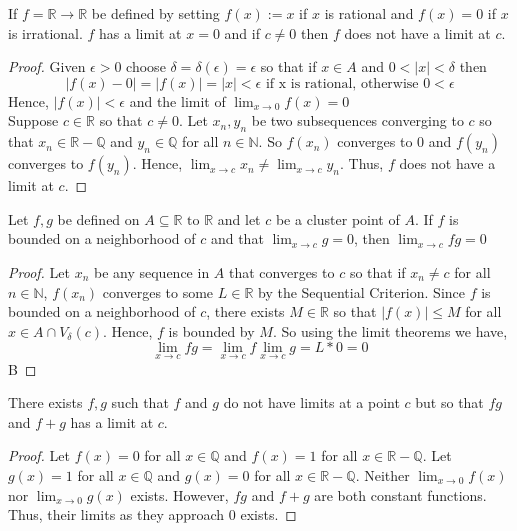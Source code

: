 \documentclass[12pt]{article}
\newcommand{\N}{\mathbb{N}}
\newcommand{\R}{\mathbb{R}}
\newenvironment{claim}[2][Claim]{\begin{trivlist}
		\item[\hskip \labelsep {\bfseries #1}\hskip \labelsep {\bfseries #2}]}{\end{trivlist}}
\begin{document}
\begin{claim}{4.1.15}
	If $f = \R \rightarrow \R$ be defined by setting $f(x) := x$ if $x$ is rational and $f(x) = 0$ if $x$ is irrational.
	$f$ has a limit at $x = 0$ and if $c \neq 0$ then $f$ does not have a limit at $c$. 
\end{claim}
\begin{proof}
	Given $\epsilon > 0$ choose $\delta = \delta(\epsilon) = \epsilon $ so that if $x \in A$ and $0 < |x| < \delta$ then
	\[
	|f(x) - 0| = |f(x)| = |x| < \epsilon \text { if x is rational, otherwise } 0 < \epsilon 
	\]
	Hence, $|f(x)| < \epsilon$ and the limit of $\lim_{x \rightarrow 0} f(x) = 0$ \\
	Suppose $c \in \R$ so that $c \neq 0$. Let $x_n, y_n$ be two subsequences converging to $c$ so that $x_n \in \R - \mathbb{Q}$ and $y_n \in \mathbb{Q}$ for all $n \in \N$. So $f(x_n)$ converges to $0$ and $f(y_n)$ converges to $f(y_n)$. Hence, $\lim_{x \rightarrow c} x_n \neq \lim_{x \rightarrow c} y_n$. Thus, $f$ does not have a limit at $c$.
\end{proof}

\begin{claim}{4.2.5}
	Let $f,g$ be defined on $A \subseteq \R \text{ to } \R$ and let $c$ be a cluster point of $A$. If $f$ is bounded on a neighborhood of $c$ and that $\lim_{x \rightarrow c} g = 0$, then $\lim_{x \rightarrow c} fg = 0$
\end{claim}
\begin{proof}
	Let $x_n$ be any sequence in $A$ that converges to $c$ so that if $x_n \neq c$ for all $n \in \N$, $f(x_n) $ converges to some $L \in \R$ by the Sequential Criterion. Since $f$ is bounded on a neighborhood of $c$, there exists $M \in \R$ so that $|f(x) | \leq M$ for all $x \in A \cap V_{\delta}(c)$. Hence, $f$ is bounded by $M$. So using the limit theorems we have,
	\[
	\lim_{x \rightarrow c} fg = \lim_{x \rightarrow c} f \lim_{x \rightarrow c} g = L * 0 = 0
	\] 
	B
\end{proof}

\begin{claim}{4.2.10}
	There exists $f,g$ such that $f$ and $g$ do not have limits at a point $c$ but so that $fg$ and $f + g$ has a limit at $c$. 	
\end{claim}
\begin{proof}
	Let $f(x) = 0$ for all $x \in \mathbb{Q}$ and $f(x) = 1$ for all $x \in \R - \mathbb{Q}$. Let $g(x) = 1$ for all $x \in \mathbb{Q}$ and $g(x) = 0$ for all $x \in \R - \mathbb{Q}$. Neither $\lim_{x \rightarrow 0} f(x)$ nor $\lim_{x \rightarrow 0} g(x)$ exists. However, $fg$ and $f + g$ are both constant functions. Thus, their limits as they approach $0$ exists.
\end{proof}
\end{document}
